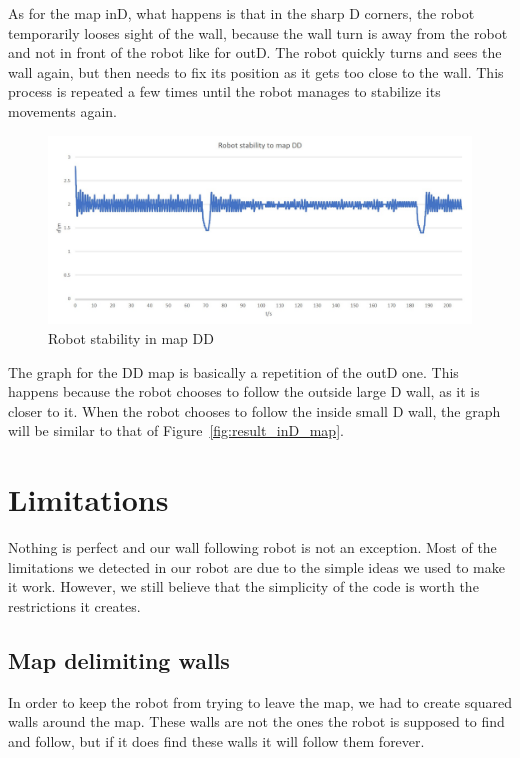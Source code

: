 \documentclass[10pt,journal,compsoc]{IEEEtran}
\begin{document}
As for the map inD, what happens is that in the sharp D corners, the robot temporarily looses sight of the wall, because the wall turn is away from the robot and not in front of the robot like for outD. The robot quickly turns and sees the wall again, but then needs to fix its position as it gets too close to the wall. This process is repeated a few times until the robot manages to stabilize its movements again.

\begin{figure}[thpb]
\centering
\includegraphics[scale=0.18]{img/map_DD.jpg}
\caption{Robot stability in map DD}
\label{fig:result_DD_map}
\end{figure}

The graph for the DD map is basically a repetition of the outD one. This happens because the robot chooses to follow the outside large D wall, as it is closer to it. When the robot chooses to follow the inside small D wall, the graph will be similar to that of Figure~\ref{fig:result_inD_map}.

\section{Limitations}

Nothing is perfect and our wall following robot is not an exception. Most of the limitations we detected in our robot are due to the simple ideas we used to make it work. However, we still believe that the simplicity of the code is worth the restrictions it creates.

\subsection{Map delimiting walls}\label{subsec:map_delimiting_walls}

In order to keep the robot from trying to leave the map, we had to create squared walls around the map. These walls are not the ones the robot is supposed to find and follow, but if it does find these walls it will follow them forever.
\end{document}
